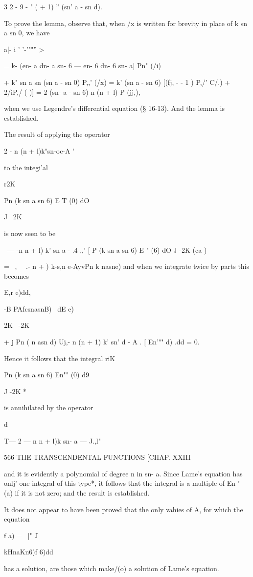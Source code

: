 {{{{{{{3 2 - 9 - " ( + 1) '' (sn' a - sn d).

To prove the lemma, observe that, when /x is written for brevity in
place of k sn a sn 0, we have

 a|- i ' '-'""'' >

= k- (en- a dn- a sn- 6 — en- 6 dn- 6 sn- a] Pn" (/i)

+ k" sn a sn (sn a - sn 0) P,,' (/x) = k' (sn a - sn 6) [(fj, - - 1 )
P,/' C/.) + 2/iP,/ ( )] = 2 (sn- a - sn 6) n (n + l) P (jj,),

when we use Legendre's differential equation (§ 16-13). And the lemma
is established.

The result of applying the operator

 2 - n (n + l)k"sn-oc-A '

to the integi'al

r2K

Pn (k sn a sn 6) E T (0) dO

J ~2K

is now seen to be

\ — -n n + l) k' sn a - .4 ,,' [ P (k sn a sn 6) E " (6) dO J -2K (ca
)

= \ , \ \ .- n + ) k-s,n e-AyvPn k nasne) and when we integrate twice
by parts this becomes

E,r e)dd,

-B PAfcsnasnB) \ dE e)

2K \ -2K

+ j Pn ( n asn d) Uj,- n (n + 1) k' sn' d - A . [ En'"" d) .dd = 0.

Hence it follows that the integral riK

Pn (k sn a sn 6) En"" (0) d9

J -2K *

is annihilated by the operator

d

T— 2 — n n + l)k sn- a — J.,l"

566 THE TRANSCENDENTAL FUNCTIONS [CHAP. XXIII

and it is evidently a polynomial of degree n in sn- a. Since Lame's
equation has onlj' one integral of this type*, it follows that the
integral is a multiple of En ' (a) if it is not zero; and the result
is established.

It does not appear to have been proved that the only vahies of A, for
which the equation

f a) = \ [" J\ \ {kHnaKn6)f 6)dd

has a solution, are those which make/(o) a solution of Lame's
equation.

}}}}}}}}
